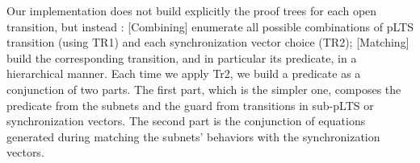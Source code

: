 \documentclass{lncs/llncs}
\newcommand{\QIN}[1]{\textcolor{airforceblue}{#1}}
\begin{document}

Our implementation does not build explicitly the proof trees for each
open transition, but instead : [Combining] enumerate all possible combinations of
pLTS transition (using TR1) and each synchronization vector choice
(TR2); [Matching] build the corresponding transition, and in particular
its predicate, in a hierarchical manner.
Each time we apply Tr2, we build a predicate as a conjunction of two
parts. The first part, which is the simpler one, composes the
predicate from the 
subnets and the guard from transitions in sub-pLTS or synchronization
vectors. The second part is the conjunction of equations generated
during matching the subnets' behaviors with the synchronization
vectors. 

 
\end{document}
